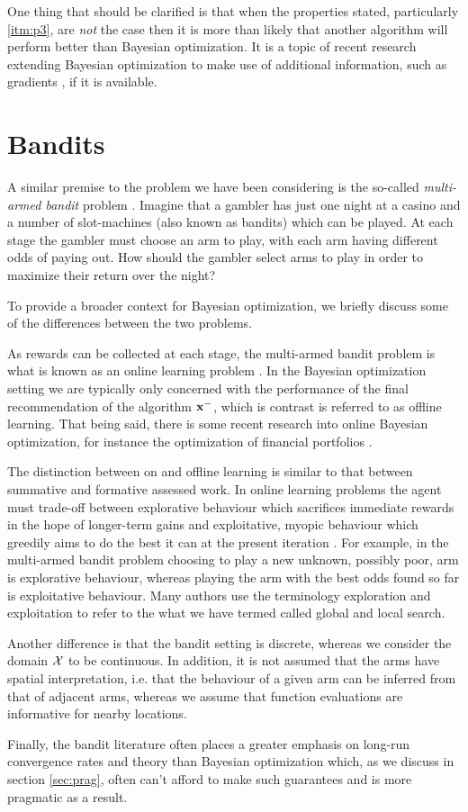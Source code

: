 One thing that should be clarified is that when the properties stated, particularly \ref{itm:p3}, are \textit{not} the case then it is more than likely that another algorithm will perform better than Bayesian optimization. It is a topic of recent research extending Bayesian optimization to make use of additional information, such as gradients \cite{lizotte}, if it is available. 

\section{Bandits} \label{sec:bandits}

A similar premise to the problem we have been considering is the so-called \textit{multi-armed bandit} problem \citep{robbins1985some}. Imagine that a gambler has just one night at a casino and a number of slot-machines (also known as bandits) which can be played. At each stage the gambler must choose an arm to play, with each arm having different odds of paying out. How should the gambler select arms to play in order to maximize their return over the night?

To provide a broader context for Bayesian optimization, we briefly discuss some of the differences between the two problems.

As rewards can be collected at each stage, the multi-armed bandit problem is what is known as an online learning problem \citep{ryzhov2012knowledge}. In the Bayesian optimization setting we are typically only concerned with the performance of the final recommendation of the algorithm $\mathbf{x}^-$, which is contrast is referred to as offline learning. That being said, there is some recent research into online Bayesian optimization, for instance the optimization of financial portfolios \cite{nyikosa2015adaptive}.

The distinction between on and offline learning is similar to that between summative and formative assessed work. In online learning problems the agent must trade-off between explorative behaviour which sacrifices immediate rewards in the hope of longer-term gains and exploitative, myopic behaviour which greedily aims to do the best it can at the present iteration \citep{gelbart}. For example, in the multi-armed bandit problem choosing to play a new unknown, possibly poor, arm is explorative behaviour, whereas playing the arm with the best odds found so far is exploitative behaviour. Many authors use the terminology exploration and exploitation to refer to the what we have termed called global and local search.

Another difference is that the bandit setting is discrete, whereas we consider the domain $\mathcal{X}$ to be continuous. In addition, it is not assumed that the arms have spatial interpretation, i.e. that the behaviour of a given arm can be inferred from that of adjacent arms, whereas we assume that function evaluations are informative for nearby locations.

Finally, the bandit literature often places a greater emphasis on long-run convergence rates and theory than Bayesian optimization \cite{gelbart} which, as we discuss in section \ref{sec:prag}, often can't afford to make such guarantees and is more pragmatic as a result.



